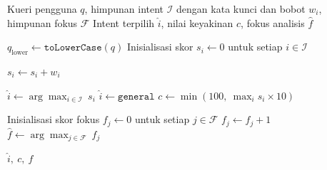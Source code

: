 \begin{algorithm}[htbp]
\caption{Klasifikasi Maksud Berbasis Pencocokan Pola Kata Kunci Berbobot}
\label{alg:intent-classification}
\begin{algorithmic}[1]
\Require Kueri pengguna $q$, himpunan intent $\mathcal{I}$ dengan kata kunci dan bobot $w_i$, himpunan fokus $\mathcal{F}$
\Ensure Intent terpilih $\hat{i}$, nilai keyakinan $c$, fokus analisis $\hat{f}$

\State $q_{\text{lower}} \gets \texttt{toLowerCase}(q)$
\State Inisialisasi skor $s_i \gets 0$ untuk setiap $i \in \mathcal{I}$

            \State $s_i \gets s_i + w_i$
        \EndIf
    \EndFor
\EndFor

\State $\hat{i} \gets \arg\max_{i \in \mathcal{I}}\ s_i$
    \State $\hat{i} \gets \texttt{general}$ 
\EndIf
\State $c \gets \min\!\left(100,\ \max_{i} s_i \times 10\right)$

\State Inisialisasi skor fokus $f_j \gets 0$ untuk setiap $j \in \mathcal{F}$
            \State $f_j \gets f_j + 1$
        \EndIf
    \EndFor
\EndFor
\State $\hat{f} \gets \arg\max_{j \in \mathcal{F}}\ f_j$

\State \Return $\hat{i},\ c,\ \hat{f}$
\end{algorithmic}
\end{algorithm}
